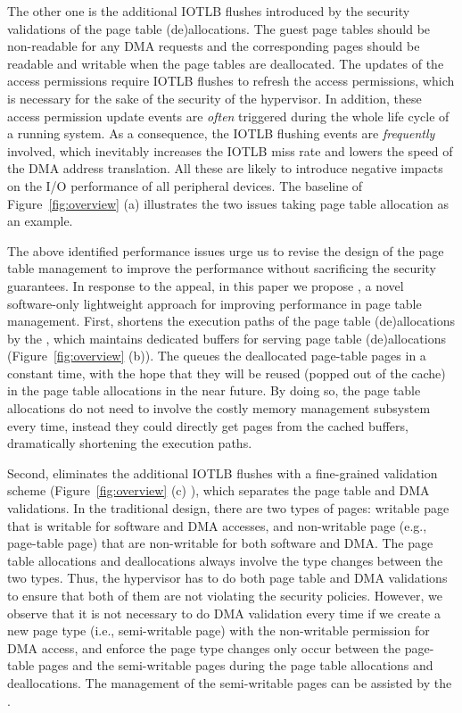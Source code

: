 The other one is the additional IOTLB flushes introduced by the security validations of the page table (de)allocations.
The guest page tables should be non-readable for any DMA requests and the corresponding pages should be readable and writable when the page tables are deallocated.
The updates of the access permissions require IOTLB flushes to refresh the access permissions, which is necessary for the sake of the security of the hypervisor.
In addition, these access permission update events are \emph{often} triggered during the whole life cycle of a running system.
As a consequence, the IOTLB flushing events are \emph{frequently} involved, which inevitably increases the IOTLB miss rate and lowers the speed of the DMA address translation.
All these are likely to introduce negative impacts on the I/O performance of all peripheral devices.
The baseline of Figure~\ref{fig:overview} (a) illustrates the two issues taking page table allocation as an example.

The above identified performance issues urge us to revise the design of the page table management to improve the performance without sacrificing the security guarantees.
In response to the appeal, in this paper we propose \name, a novel software-only lightweight approach for improving performance in page table management.
First, \name shortens the execution paths of the page table (de)allocations by the \cache, which maintains dedicated buffers for serving page table (de)allocations (Figure~\ref{fig:overview} (b)).
The \cache queues the deallocated page-table pages in a constant time, with the hope that
they will be reused (popped out of the cache) in the page table allocations in the near future.
By doing so, the page table allocations do not need to involve the costly memory management subsystem every time, instead they could directly get pages from the cached buffers, dramatically shortening the execution paths.

Second, \name eliminates the additional IOTLB flushes with a fine-grained validation scheme (Figure~\ref{fig:overview} (c) ), which separates the page table and DMA validations.
In the traditional design, there are two types of pages: writable page that is writable for software and DMA accesses, and non-writable page (e.g., page-table page) that are non-writable for both software and DMA.
The page table allocations and deallocations always involve the type changes between the two types.
Thus, the hypervisor has to do both page table and DMA validations to ensure that both of them are not violating the security policies.
However, we observe that it is not necessary to do DMA validation every time if we create a new page type (i.e., semi-writable page) with the non-writable permission for DMA access, and enforce the page type changes only occur between the page-table pages and the semi-writable pages during the page table allocations and deallocations.
The management of the semi-writable pages can be assisted by the \cache.

